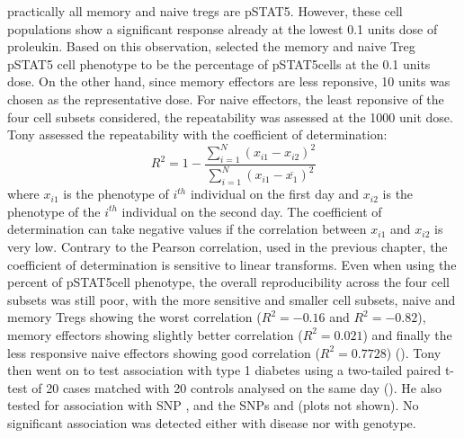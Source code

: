 practically all memory and naive tregs are pSTAT5\positive.
However, these cell populations show a significant response already at the lowest 0.1 units dose of proleukin.
Based on this observation,  selected the
memory and naive Treg pSTAT5 cell phenotype to be the percentage of pSTAT5\positive cells at the 0.1 units dose.
On the other hand, since memory effectors are less reponsive, 10 units was chosen as the representative dose.
For naive effectors, the least reponsive of the four cell subsets considered, the repeatability was assessed at the 1000 unit dose.
Tony assessed the repeatability with the coefficient of determination:
\[
  R^2 = 1 - \frac{\sum_{i=1}^N (x_{i1}-x_{i2})^2}{\sum_{i=1}^N (x_{i1}-\overline{x_1})^2}
\]
where $x_{i1}$ is the phenotype of $i^{th}$ individual on the first day and $x_{i2}$
is the phenotype of the $i^{th}$ individual on the second day.
The coefficient of determination can take negative values if the correlation between $x_{i1}$ and $x_{i2}$ is very low.
Contrary to the Pearson correlation, used in the previous chapter, the coefficient of determination is sensitive to linear transforms.
Even when using the percent of pSTAT5\positive cell phenotype,
the overall reproducibility across the four cell subsets was still poor,
with the more sensitive and smaller cell subsets,
naive and memory Tregs showing the worst correlation ($R^2=-0.16$ and $R^2=-0.82$), memory effectors showing slightly better correlation ($R^2=0.021$)
and finally the less responsive naive effectors showing good correlation ($R^2=0.7728$) ().
Tony then went on to test association with type 1 diabetes using a two-tailed paired t-test of 20 cases matched with 20 controls analysed on the same
day ().
He also tested for association with  SNP , and the
 SNPs  and  (plots not shown).
No significant association was detected either with disease nor with genotype.

